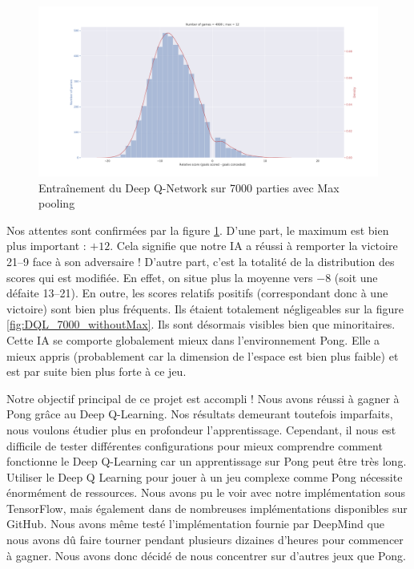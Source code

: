 \begin{figure}[h]
 \centering
 \includegraphics[width  = \textwidth]{img/DQL_7000_withMax.png}
 \caption{Entraînement du Deep Q-Network sur 7000 parties avec Max pooling}
 \label{fig:DQL_7000_withMax}
\end{figure}

Nos attentes sont confirmées par la figure \ref{fig:DQL_7000_withMax}. D'une part, le maximum est bien plus important : $+\num{12}$. Cela signifie que notre IA a 
réussi à remporter la victoire 21--9 face à son adversaire ! D'autre part, c'est la totalité de la distribution des scores qui est modifiée. En effet, on situe 
plus la moyenne vers $\num{-8}$ (soit une défaite 13--21). En outre, les scores relatifs positifs (correspondant donc à une victoire) sont bien plus fréquents. Ils
étaient totalement négligeables sur la figure \ref{fig:DQL_7000_withoutMax}. Ils sont désormais visibles bien que minoritaires. Cette IA se comporte
globalement mieux dans l'environnement Pong. Elle a mieux appris (probablement car la dimension de l'espace est bien plus faible) et est par suite bien plus forte
à ce jeu.

Notre objectif principal de ce projet est accompli ! Nous avons réussi à gagner à Pong grâce au Deep Q-Learning. Nos résultats demeurant toutefois imparfaits, nous
voulons étudier plus en profondeur l'apprentissage. Cependant, il nous est difficile de tester différentes configurations pour mieux comprendre comment fonctionne le Deep Q-Learning car un apprentissage sur Pong peut être très long. Utiliser le Deep Q Learning pour jouer à un jeu complexe comme Pong nécessite énormément de ressources. Nous avons pu le voir avec notre implémentation sous TensorFlow, mais également dans de nombreuses implémentations disponibles sur GitHub. Nous avons même testé l'implémentation fournie par DeepMind que nous avons dû faire tourner pendant plusieurs dizaines d'heures pour commencer à gagner. Nous avons donc décidé de nous concentrer sur d'autres jeux que Pong.


